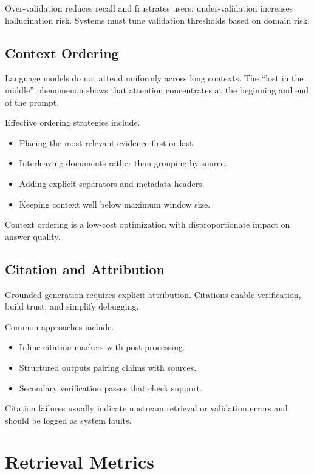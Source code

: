 Over-validation reduces recall and frustrates users; under-validation increases hallucination risk. Systems must tune validation thresholds based on domain risk.

\subsection{Context Ordering}

Language models do not attend uniformly across long contexts. The ``lost in the middle'' phenomenon \cite{liu2024lost} shows that attention concentrates at the beginning and end of the prompt.

Effective ordering strategies include.
\begin{itemize}
\item Placing the most relevant evidence first or last.
\item Interleaving documents rather than grouping by source.
\item Adding explicit separators and metadata headers.
\item Keeping context well below maximum window size.
\end{itemize}

Context ordering is a low-cost optimization with disproportionate impact on answer quality.

\subsection{Citation and Attribution}

Grounded generation requires explicit attribution. Citations enable verification, build trust, and simplify debugging.

Common approaches include.
\begin{itemize}
\item Inline citation markers with post-processing.
\item Structured outputs pairing claims with sources.
\item Secondary verification passes that check support.
\end{itemize}

Citation failures usually indicate upstream retrieval or validation errors and should be logged as system faults.

\section{Retrieval Metrics}

